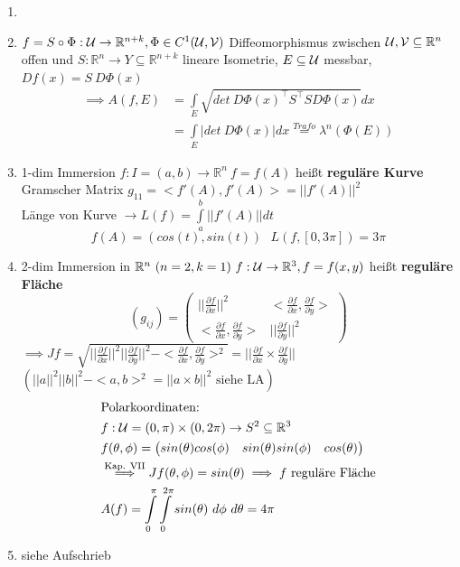   \newpage
  \begin{example}
    \begin{enumerate}
      \item[]
      \item $f = S \circ \Phi: \mathcal{U} \to \mathbb{R}^{n+k}, \Phi \in C^1(\mathcal{U}, \mathcal{V})$ Diffeomorphismus zwischen $\mathcal{U}, \mathcal{V} \subseteq \mathbb{R}^n$ offen und $S: \mathbb{R}^n \to Y \subseteq \mathbb{R}^{n+k}$ lineare Isometrie, $E \subseteq \mathcal{U}$ messbar, $Df(x) = S \ D\Phi(x)$
        \begin{align*}
          \implies A(f,E) 
          &= \int\limits_E \sqrt{det \ D\Phi(x)^{\top} S^{\top} S D\Phi(x)} dx\\
          &= \int\limits_E |det \ D\Phi(x)| dx \stackrel{Trafo}{=} \lambda^n(\Phi(E))
        \end{align*}
      \item 1-dim Immersion $f: I = (a,b) \to \mathbb{R}^n \ f=f(A)$ heißt \textbf{reguläre Kurve} Gramscher Matrix $g_{11}=<f'(A), f'(A)> = ||f'(A)||^2$\\
        Länge von Kurve $\rightarrow L(f) = \int\limits_a^b ||f'(A)|| dt$\\
        $$f(A) = (cos(t), sin(t)) \ \ \ L(f, [0, 3\pi]) = 3\pi$$
      \item 2-dim Immersion in $\mathbb{R}^n \ (n=2, k=1) \ f:\script{U}\to\mathbb{R}^3, f=f(x,y)$ heißt \textbf{reguläre Fläche}
        $$(g_{ij}) = \begin{pmatrix}
          ||\frac{\partial f}{\partial x}||^2 & <\frac{\partial f}{\partial x}, \frac{\partial f}{\partial y}>\\
          <\frac{\partial f}{\partial x}, \frac{\partial f}{\partial y}> & ||\frac{\partial f}{\partial y}||^2
        \end{pmatrix}$$ 
        $\implies Jf = \sqrt{||\frac{\partial f}{\partial x}||^2 ||\frac{\partial f}{\partial y}||^2 - <\frac{\partial f}{\partial x}, \frac{\partial f}{\partial y}>^2} = ||\frac{\partial f}{\partial x} \times \frac{\partial f}{\partial y}||$\\
        $(||a||^2||b||^2-<a,b>^2 = ||a \times b||^2 \text{ siehe LA})$\\
        \begin{align*}
          &\text{Polarkoordinaten:}\\
          &f: \mathcal{U} = (0, \pi) \times (0, 2\pi) \to S^2\subseteq \mathbb{R}^3\\
          &f(\theta, \phi) = \begin{pmatrix}
            sin(\theta)cos(\phi) & sin(\theta)sin(\phi) & cos(\theta)
          \end{pmatrix}\\
          &\stackrel{\text{Kap. VII}}{\implies} Jf(\theta, \phi) = sin(\theta) \implies f \text{ reguläre Fläche}\\
          &A(f) = \int\limits_0^{\pi}\int\limits_0^{2\pi} sin(\theta) \ d\phi \ d\theta = 4\pi
        \end{align*}
      \item siehe Aufschrieb
    \end{enumerate}
  \end{example}

